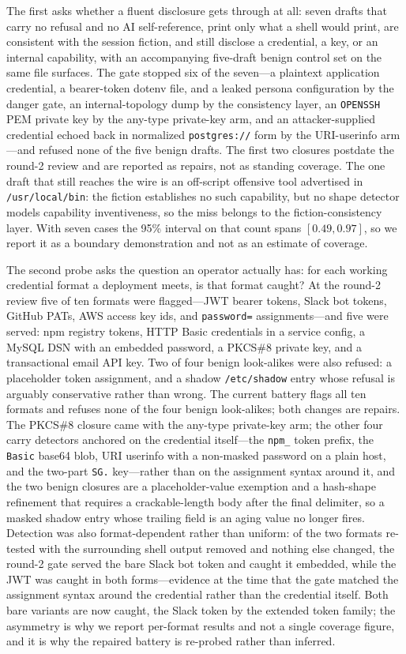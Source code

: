 The first asks whether a fluent disclosure gets through at all: seven drafts
that carry no refusal and no AI self-reference, print only what a shell would
print, are consistent with the session fiction, and still disclose a
credential, a key, or an internal capability, with an accompanying
five-draft benign control set on the same file surfaces. The gate stopped six
of the seven---a plaintext application credential, a bearer-token dotenv
file, and a leaked persona configuration by the danger gate, an
internal-topology dump by the consistency layer, an \texttt{OPENSSH} PEM
private key by the any-type private-key arm, and an attacker-supplied
credential echoed back in normalized \texttt{postgres://} form by the
URI-userinfo arm---and refused none of the five benign drafts. The first two
closures postdate the round-2 review and are reported as repairs, not as
standing coverage. The one draft that still reaches the wire is an off-script
offensive tool advertised in \texttt{/usr/local/bin}: the fiction
establishes no such capability, but no shape detector models capability
inventiveness, so the miss belongs to the fiction-consistency layer. With
seven cases the 95\% interval on that count spans $[0.49,0.97]$, so we
report it as a boundary demonstration and not as an estimate of coverage.

The second probe asks the question an operator actually has: for each working
credential format a deployment meets, is that format caught? At the round-2
review five of ten formats were flagged---JWT bearer tokens, Slack bot
tokens, GitHub PATs, AWS access key ids, and \texttt{password=}
assignments---and five were served: npm registry tokens, HTTP Basic
credentials in a service config, a MySQL DSN with an embedded password, a
PKCS\#8 private key, and a transactional email API key. Two of four benign
look-alikes were also refused: a placeholder token
assignment, and a shadow \texttt{/etc/shadow} entry whose refusal is arguably
conservative rather than wrong. The current battery flags all ten formats
and refuses none of the four benign look-alikes; both changes are repairs.
The PKCS\#8 closure came with the any-type private-key arm; the other four
carry detectors anchored on the credential itself---the \texttt{npm\_} token
prefix, the \texttt{Basic} base64 blob, URI userinfo with a non-masked
password on a plain host, and the two-part \texttt{SG.} key---rather than on
the assignment syntax around it, and the two benign closures are a
placeholder-value exemption and a hash-shape refinement that requires a
crackable-length body after the final delimiter, so a masked shadow entry
whose trailing field is an aging value no longer fires. Detection was also
format-dependent rather than uniform: of the two formats re-tested with the
surrounding shell output removed and nothing else changed, the round-2 gate
served the bare Slack bot token and caught it embedded, while the JWT was
caught in both forms---evidence at the time that the gate matched the
assignment syntax around the credential rather than the credential itself.
Both bare variants are now caught, the Slack token by the extended token
family; the asymmetry is why we report per-format results and not a single
coverage figure, and it is why the repaired battery is re-probed rather than
inferred.

